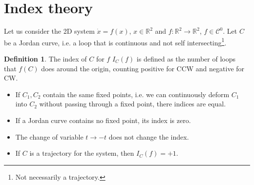 \documentclass[12pt, openany]{report}
\theoremstyle{definition}
\newtheorem{definition}[thm]{Definition}
\newcommand{\R}{\mathbb{R}}
\begin{document}
\section{Index theory}
Let us consider the 2D system \(\dot x=f(x)\), \(x\in \R^2\) and \(f:\R^2\rightarrow \R^2\), \(f\in \mathcal{C}^0\). Let \(C\) be a Jordan curve, i.e. a loop that is continuous and not self intersecting\footnote{Not necessarily a trajectory.}.
\begin{definition}
    The index of \(C\) for \(f\) \(I_C(f)\) is defined as the number of loops that \(f(C)\) does around the origin, counting positive for CCW and negative for CW.
\end{definition}
\begin{itemize}
    \item If \(C_1,C_2\) contain the same fixed points, i.e. we can continuously deform \(C_1\) into \(C_2\) without passing through a fixed point, there indices are equal.
    \item If a Jordan curve contains no fixed point, its index is zero.
    \item The change of variable \(t\rightarrow -t\) does not change the index.
    \item If \(C\) is a trajectory for the system, then \(I_C(f) = +1\).
\end{itemize}
\end{document}
